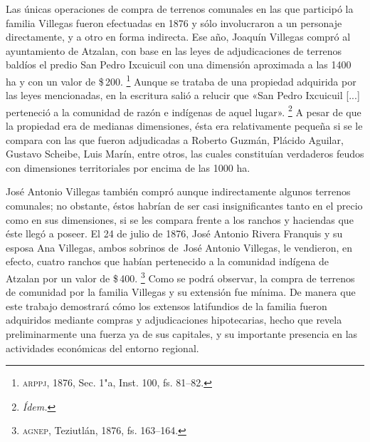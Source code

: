 \documentclass[14pt,twoside,final]{extbook} %
\let\oldfootnote\footnote
\renewcommand\footnote[1]{%
\oldfootnote{\hspace{1mm}#1}}
\begin{document}
Las únicas operaciones de compra de terrenos comunales en las que participó la familia Villegas fueron efectuadas en 1876 y sólo involucraron a un personaje directamente, y a otro en forma indirecta. Ese año, Joaquín Villegas compró al ayuntamiento de Atzalan, con base en las leyes de adjudicaciones de terrenos baldíos el predio San Pedro Ixcuicuil con una dimensión aproximada a las 1400 ha y con un valor de \$\,200.\footnote{\textsc{arppj}, 1876, Sec. 1"a, Inst. 100, fs. 81--82.} Aunque se trataba de una propiedad adquirida por las leyes mencionadas, en la escritura salió a relucir que «San Pedro Ixcuicuil [...] perteneció a la comunidad de razón e indígenas de aquel lugar».\footnote{\em Ídem.} A pesar de que la propiedad era de medianas dimensiones, ésta era relativamente pequeña si se le compara con las que fueron adjudicadas a Roberto Guzmán, Plácido Aguilar, Gustavo Scheibe, Luis Marín, entre otros, las cuales constituían verdaderos feudos con dimensiones territoriales por encima de las 1000 ha.

José Antonio Villegas también compró aunque indirectamente algunos terrenos comunales; no obstante, éstos habrían de ser casi insignificantes tanto en el precio como en sus dimensiones, si se les compara frente a los ranchos y haciendas que éste llegó a poseer. El 24 de julio de 1876, José Antonio Rivera Franquis y su esposa Ana Villegas, ambos sobrinos de~José Antonio Villegas, le vendieron, en efecto, cuatro ranchos que habían pertenecido a la comunidad indígena de Atzalan por un valor de \$\,400.\footnote{\textsc{agnep}, Teziutlán, 1876, fs. 163--164.} Como se podrá observar, la compra de terrenos de comunidad por la familia Villegas y su extensión fue mínima. De manera que este trabajo demostrará cómo los extensos latifundios de la familia fueron adquiridos mediante compras y adjudicaciones hipotecarias, hecho que revela preliminarmente una fuerza ya de sus capitales, y su importante presencia en las actividades económicas del entorno regional.
\end{document}
